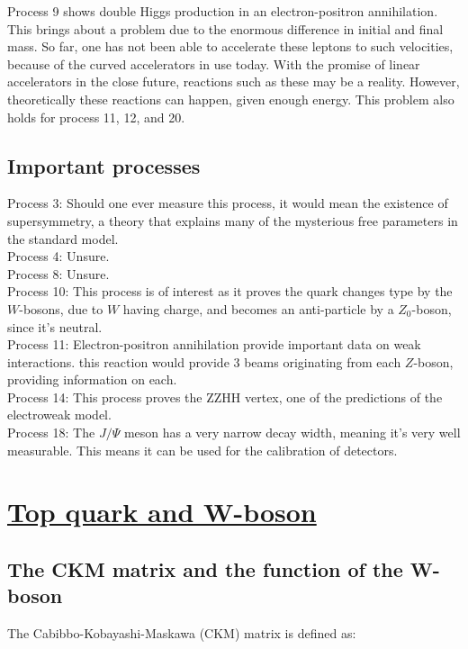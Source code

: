 \documentclass[11pt,a4paper]{article}
\begin{document}
Process 9 shows double Higgs production in an electron-positron annihilation. This brings about a problem due to the enormous difference in initial and final mass. So far, one has not been able to accelerate these leptons to such velocities, because of the curved accelerators in use today. With the promise of linear accelerators in the close future, reactions such as these may be a reality. However, theoretically these reactions can happen, given enough energy. This problem also holds for process 11, 12, and 20.

\subsection{Important processes}
Process 3: Should one ever measure this process, it would mean the existence of supersymmetry, a theory that explains many of the mysterious free parameters in the standard model.\\

Process 4: Unsure.\\

Process 8: Unsure.\\

Process 10: This process is of interest as it proves the quark changes type by the $W$-bosons, due to $W$ having charge, and becomes an anti-particle by a $Z_0$-boson, since it's neutral.\\

Process 11: Electron-positron annihilation provide important data on weak interactions. this reaction would provide 3 beams originating from each $Z$-boson, providing information on each.\\

Process 14: This process proves the ZZHH vertex, one of the predictions of the electroweak model.\\

Process 18: The $J/\Psi$ meson has a very narrow decay width, meaning it's very well measurable. This means it can be used for the calibration of detectors.


\section{\underline{Top quark and W-boson}}
\subsection{The CKM matrix and the function of the W-boson}
The Cabibbo-Kobayashi-Maskawa (CKM) matrix is defined as:
\end{document}
